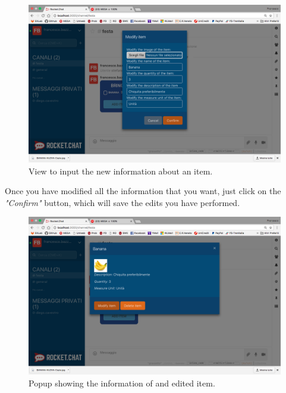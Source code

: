 \begin{figure}[H]
  \centering 
  \includegraphics[width=\textwidth]{Sections/3-HowToUse/Images/popup_item_edit_filled.png}
  \caption{View to input the new information about an item.}
\end{figure}


Once you have modified all the information that you want, just click on the \textit{"Confirm"} button, which will save the edits you have performed.

\begin{figure}[H]
  \centering 
  \includegraphics[width=\textwidth]{Sections/3-HowToUse/Images/item_edited.png}
  \caption{Popup showing the information of and edited item.}
\end{figure}